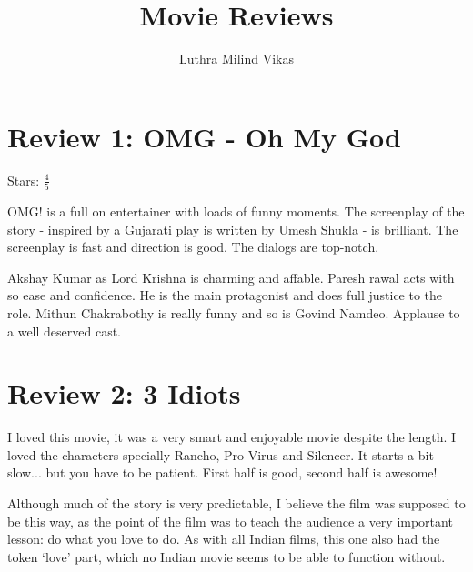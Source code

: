 \documentclass{article}
\author{Luthra Milind Vikas}
\date{}
\title{Movie Reviews}
\begin{document}
\maketitle

\section{Review 1: OMG - Oh My God}

Stars: $\frac{4}{5}$


OMG! is a full on entertainer with loads of funny moments. The screenplay of the story - inspired by a Gujarati play is written by Umesh Shukla - is brilliant. The screenplay is fast and direction is good. The dialogs are top-notch.

Akshay Kumar as Lord Krishna is charming and affable. Paresh rawal acts with so ease and confidence. He is the main protagonist and does full justice to the role. Mithun Chakrabothy is really funny and so is Govind Namdeo. Applause to a well deserved cast.


\section{Review 2: 3 Idiots}

I loved this movie, it was a very smart and enjoyable movie despite the length. I loved the characters specially Rancho, Pro Virus and Silencer. It starts a bit slow... but you have to be patient. First half is good, second half is awesome!

Although much of the story is very predictable, I believe the film was supposed to be this way, as the point of the film was to teach the audience a very important lesson: do what you love to do. As with all Indian films, this one also had the token `love' part, which no Indian movie seems to be able to function without.


\end{document}
